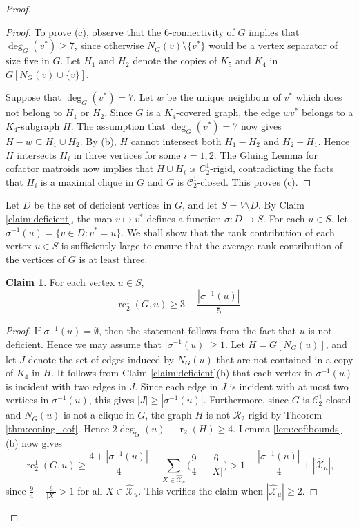 \documentclass[11pt,a4paper]{article}
\theoremstyle{definition}
\newtheorem{claim}[theorem]{Claim}
\DeclareMathOperator{\rr}{r}
\DeclareMathOperator{\rc}{rc}
\newcommand{\hXX}{\hat{\mathcal{X}}}
\newcommand{\cC}{\mathcal{C}}
\begin{document}
\begin{proof}
\begin{proof}
To prove (c), observe that the 6-connectivity of $G$ implies that $\deg_G(v^*)\geq 7$, since otherwise $N_G(v)\setminus \{v^*\}$ would be a vertex separator of size five in $G$. 
Let $H_1$ and $H_2$ denote the copies of $K_5$ and $K_4$ in $G[N_G(v)\cup \{v\}]$. 

Suppose that $\deg_G(v^*)=7$. Let $w$ be the unique neighbour of $v^*$
which does not belong to $H_1$ or $H_2$. Since $G$ is a $K_4$-covered graph, the edge
$wv^*$ belongs to a $K_4$-subgraph $H$. 
The assumption that $\deg_G(v^*)=7$ now gives $H-w\subseteq H_1\cup H_2$.
By (b), $H$
cannot intersect both $H_1-H_2$ and $H_2-H_1$. Hence $H$ intersects $H_i$
in three vertices for some $i=1,2$.  The Gluing Lemma for cofactor matroids now implies that $H\cup H_i$ is $C_2^1$-rigid, contradicting the facts that $H_i$ is a maximal clique in $G$ and $G$ is $\cC_2^1$-closed. This proves (c). 
\end{proof}

Let $D$
be the set of deficient vertices in $G$, and let $S=V\setminus D.$ %
By Claim \ref{claim:deficient}, the map $v\mapsto v^*$ defines a function $\sigma:D\to S$. For each $u\in S$, let $\sigma^{-1}(u)=\{v\in D : v^*=u\}$.
We shall show that the rank contribution of each vertex $u\in S$ is 
sufficiently large to ensure that the average rank contribution of the vertices of $G$ is at least three.

\begin{claim}\label{claim:surplus}
For each vertex  $u\in S$, \begin{equation}\label{eq:3+s/5}
\rc_2^1(G,u)\geq 3+\frac{|\sigma^{-1}(u)|}{5}.
\end{equation}
\end{claim}

\begin{proof}
If $\sigma^{-1}(u)=\emptyset$, then the statement follows from the fact that $u$ is not deficient. Hence we may assume  that $|\sigma^{-1}(u)|\geq 1$. 
Let $H=G[N_G(u)]$, and let $J$ denote the set of edges induced by $N_G(u)$ that are not contained in a copy of $K_4$ in $H$.
It follows from Claim \ref{claim:deficient}(b) that each vertex in $ \sigma^{-1}(u)$ is incident with two edges in $J$. Since each edge in $J$ is incident with at most two vertices in $\sigma^{-1}(u)$, this gives
$|J|\geq |\sigma^{-1}(u)|$. 
Furthermore, since $G$ is $\cC_2^1$-closed and $N_G(u)$ is not a clique in $G$, the graph $H$ is not $\mathcal{R}_2$-rigid by Theorem \ref{thm:coning_cof}. Hence $2\deg_G(u)-\rr_2(H)\geq 4$.  Lemma \ref{lem:cof:bounds}(b) now gives 
$$\rc_2^1(G,u)\geq \frac{4+|\sigma^{-1}(u)|}{4} +\sum_{X\in \hXX_u}\Big(\frac{9}{4}-\frac{6}{|X|}\Big)> 1+ \frac{|\sigma^{-1}(u)|}{4}+|\hXX_u|,$$
since $\frac{9}{4}-\frac{6}{|X|}>1$ for all $X\in  \hXX_u$. This verifies
the claim  when $|\hXX_u|\geq 2$.


\end{proof}
\end{proof}
\end{document}
